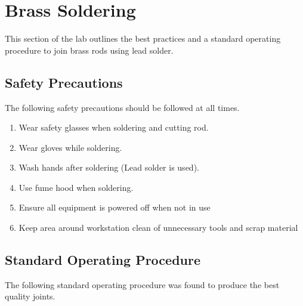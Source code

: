 \section{Brass Soldering}

This section of the lab outlines the best practices and a standard operating procedure to join brass rods using lead solder.

\subsection{Safety Precautions}


The following safety precautions should be followed at all times.

\begin{enumerate}
\item Wear safety glasses when soldering and cutting rod.
\item Wear gloves while soldering.
\item Wash hands after soldering (Lead solder is used).
\item Use fume hood when soldering.
\item Ensure all equipment is powered off when not in use
\item Keep area around workstation clean of unnecessary tools and scrap material 
\end{enumerate}

\subsection{Standard Operating Procedure}

The following standard operating procedure was found to produce the best quality joints.


